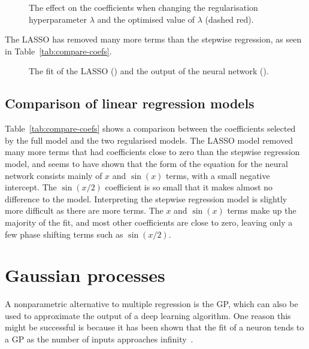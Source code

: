 \begin{figure}[htbp]
	\centering
	
	\caption{The effect on the coefficients when changing the regularisation hyperparameter \(\lambda\) and the optimised value of \(\lambda\) (dashed red).}
	\label{fig:lasso-lambda}
\end{figure}


The \ac{LASSO} has removed many more terms than the stepwise regression, as seen in Table~\ref{tab:compare-coefs}.

\begin{figure}[htbp]
	\centering
	
	\caption{The fit of the \ac{LASSO} (\lassocolour) and the output of the neural network (\nncolour).}
	\label{fig:lasso-fit}
\end{figure}

\subsection{Comparison of linear regression models}

Table~\ref{tab:compare-coefs} shows a comparison between the coefficients selected by the full model and the two regularised models.
The \ac{LASSO} model removed many more terms that had coefficients close to zero than the stepwise regression model, and seems to have shown that the form of the equation for the neural network consists mainly of \(x\) and \(\sin(x)\) terms, with a small negative intercept.
The \(\sin(x/2)\) coefficient is so small that it makes almost no difference to the model.
Interpreting the stepwise regression model is slightly more difficult as there are more terms.
The \(x\) and \(\sin(x)\) terms make up the majority of the fit, and most other coefficients are close to zero, leaving only a few phase shifting terms such as \(\sin(x/2)\).


\section{Gaussian processes}

A nonparametric alternative to multiple regression is the \ac{GP}, which can also be used to approximate the output of a deep learning algorithm.
One reason this might be successful is because it has been shown that the fit of a neuron tends to a \ac{GP} as the number of inputs approaches infinity~\autocite{neal1996}.

